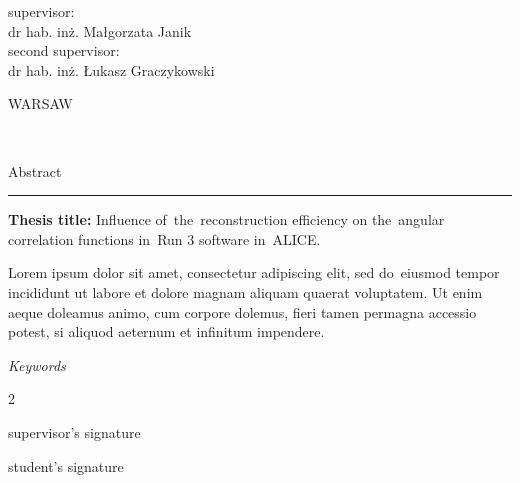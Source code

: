 \documentclass[11pt,a4paper,twoside]{book}
\numberwithin{equation}{chapter}
\newcommand{\thesistitle}{Influence of the reconstruction efficiency on the angular correlation functions in Run 3 software in ALICE.}
\begin{document}
\begin{titlepage}
    \vspace{1.5cm}

    \begin{minipage}{\textwidth}
        \begin{center}
            {\large supervisor: \\
                dr hab. inż. Małgorzata Janik}\\
            \vspace{0.5cm}
            {\large second supervisor: \\
                dr hab. inż. Łukasz Graczykowski}
        \end{center}
    \end{minipage}%

    \vfill

    \begin{minipage}[b]{\textwidth}
        \begin{center}
            {\large WARSAW \the\year{}}
        \end{center}
    \end{minipage}
\end{titlepage}

\newpage
\mbox{ }

\newpage
{\Large Abstract}

{\color{plum}\rule[1pt]{\textwidth}{2pt}}

\textbf{Thesis title:} \thesistitle


Lorem ipsum dolor sit amet, consectetur adipiscing elit, sed do eiusmod tempor incididunt ut
labore et dolore magnam aliquam quaerat voluptatem. Ut enim aeque doleamus animo, cum
corpore dolemus, fieri tamen permagna accessio potest, si aliquod aeternum et infinitum
impendere.

\vspace{0.025\textheight}
\textit{Keywords}\\
\textit{}

\vfill

\begin{multicols}{2}
    \begin{flushleft}
        supervisor's signature
    \end{flushleft}
    \begin{flushright}
        student's signature
    \end{flushright}
\end{multicols}

\newpage
\mbox{ }
\end{document}
